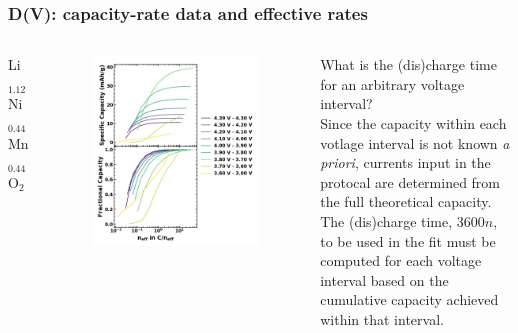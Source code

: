 \documentclass{beamer}
\begin{document}
\begin{frame}
\frametitle{D(V): capacity-rate data and effective rates}

\begin{columns}
	\centering Li$_{1.12}$Ni$_{0.44}$Mn$_{0.44}$O$_2$
	\vspace{-0.3cm}
	\begin{figure}
		\includegraphics[width=0.95\linewidth]{figs/cap-rate_Li112Ni50Mn50.jpg}
	\end{figure}

	What is the (dis)charge time for an arbitrary voltage interval? \\
	\vspace{\baselineskip}
	Since the capacity within each votlage interval is not known \emph{a priori}, currents input in the protocal are determined from the full theoretical capacity.\\
	\vspace{\baselineskip}
	The (dis)charge time, $3600n$, to be used in the fit must be computed for each voltage interval based on the cumulative capacity achieved within that interval.

\end{columns}

\end{frame}
\end{document}
